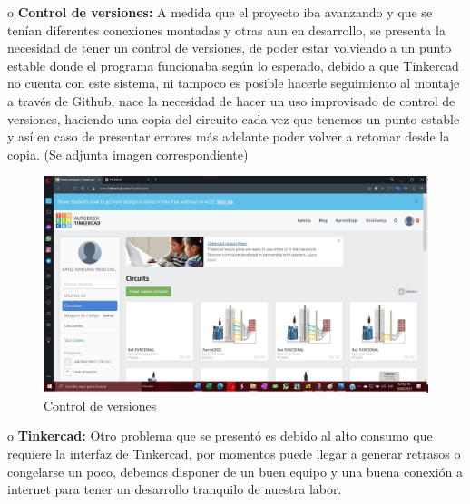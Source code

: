 \documentclass{article}
\begin{document}
o	\textbf{Control de versiones:} A medida que el proyecto iba avanzando y que se tenían diferentes conexiones montadas y otras aun en desarrollo, se presenta la necesidad de tener un control de versiones, de poder estar volviendo a un punto estable donde el programa funcionaba según lo esperado, debido a que Tinkercad no cuenta con este sistema, ni tampoco es posible hacerle seguimiento al montaje a través de Github, nace la necesidad de hacer un uso improvisado de control de versiones, haciendo una copia del circuito cada vez que tenemos un punto estable y así en caso de presentar errores más adelante poder volver a retomar desde la copia. (Se adjunta imagen correspondiente)\par
\begin{figure}[H]
\includegraphics[width=12cm]{control de versiones.jpg}
\centering
\caption{Control de versiones}
\label{fig:control-de-versiones}
\end{figure}

o	\textbf{Tinkercad:} Otro problema que se presentó es debido al alto consumo que requiere la interfaz de Tinkercad, por momentos puede llegar a generar retrasos o congelarse un poco, debemos disponer de un buen equipo y una buena conexión a internet para tener un desarrollo tranquilo de nuestra labor.\par
\end{document}
